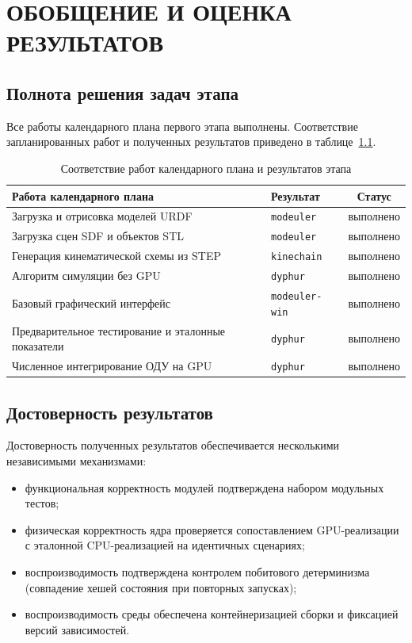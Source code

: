 \chapter{ОБОБЩЕНИЕ И ОЦЕНКА РЕЗУЛЬТАТОВ}
\label{cha:results}

\section{Полнота решения задач этапа}

Все работы календарного плана первого этапа выполнены. Соответствие
запланированных работ и полученных результатов приведено в
таблице~\ref{tab:summary}.

\begin{table}[ht]
  \centering
  \caption{Соответствие работ календарного плана и результатов этапа}
  \label{tab:summary}
  \small
  \begin{tabular}{p{} p{} c}
    \toprule
    Работа календарного плана & Результат & Статус \\
    \midrule
    Загрузка и отрисовка моделей URDF & \texttt{modeuler} & выполнено \\
    Загрузка сцен SDF и объектов STL & \texttt{modeuler} & выполнено \\
    Генерация кинематической схемы из STEP & \texttt{kinechain} & выполнено \\
    Алгоритм симуляции без GPU & \texttt{dyphur} & выполнено \\
    Базовый графический интерфейс & \texttt{modeuler-win} & выполнено \\
    Предварительное тестирование и эталонные показатели & \texttt{dyphur} & выполнено \\
    Численное интегрирование ОДУ на GPU & \texttt{dyphur} & выполнено \\
    \bottomrule
  \end{tabular}
\end{table}

\section{Достоверность результатов}

Достоверность полученных результатов обеспечивается несколькими независимыми
механизмами:
\begin{itemize}
  \item функциональная корректность модулей подтверждена набором модульных
        тестов;
  \item физическая корректность ядра проверяется сопоставлением GPU-реализации с
        эталонной CPU-реализацией на идентичных сценариях;
  \item воспроизводимость подтверждена контролем побитового детерминизма
        (совпадение хешей состояния при повторных запусках);
  \item воспроизводимость среды обеспечена контейнеризацией сборки и фиксацией
        версий зависимостей.
\end{itemize}

